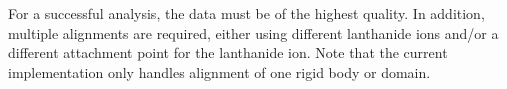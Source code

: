 For a successful analysis, the data must be of the highest quality.
In addition, multiple alignments are required, either using different lanthanide ions and/or a different attachment point for the lanthanide ion.
Note that the current implementation only handles alignment of one rigid body or domain.
